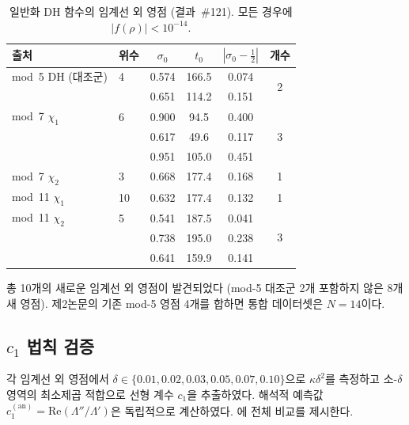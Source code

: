 \documentclass[11pt, a4paper]{article}
\theoremstyle{plain}
\theoremstyle{definition}
\newcommand{\abs}[1]{\left|#1\right|}
\newcommand{\Lam}{\Lambda}             %
\newcommand{\kap}{\kappa}             %
\begin{document}
\begin{table}[ht]
\centering
\caption{일반화 DH 함수의 임계선 외 영점 (결과~\#121).
  모든 경우에 $\abs{f(\rho)} < 10^{-14}$.}
\label{tab:dh-zeros}
\begin{tabular}{@{}llcccc@{}}
\toprule
\textbf{출처} & \textbf{위수} & $\sigma_{0}$ & $t_{0}$ &
  $\abs{\sigma_{0}-\tfrac{1}{2}}$ & \textbf{개수} \\
\midrule
mod~5 DH (대조군) & 4 & 0.574 & 166.5 & 0.074 & \multirow{2}{*}{2} \\
                   &   & 0.651 & 114.2 & 0.151 & \\
\midrule
mod~7 $\chi_{1}$ & 6 & 0.900 & 94.5 & 0.400 & \multirow{3}{*}{3} \\
                 &   & 0.617 & 49.6 & 0.117 & \\
                 &   & 0.951 & 105.0 & 0.451 & \\
\midrule
mod~7 $\chi_{2}$ & 3 & 0.668 & 177.4 & 0.168 & 1 \\
\midrule
mod~11 $\chi_{1}$ & 10 & 0.632 & 177.4 & 0.132 & 1 \\
\midrule
mod~11 $\chi_{2}$ & 5 & 0.541 & 187.5 & 0.041 & \multirow{3}{*}{3} \\
                  &   & 0.738 & 195.0 & 0.238 & \\
                  &   & 0.641 & 159.9 & 0.141 & \\
\bottomrule
\end{tabular}
\end{table}

총 10개의 새로운 임계선 외 영점이 발견되었다 (mod-5 대조군 2개 포함하지 않은 8개 새 영점).
제2논문의 기존 mod-5 영점 4개를 합하면 통합 데이터셋은 $N=14$이다.


\subsection{$c_{1}$ 법칙 검증}
\label{sec:c1-verify}

각 임계선 외 영점에서 $\delta \in \{0.01, 0.02, 0.03, 0.05, 0.07, 0.10\}$으로
$\kap\delta^{2}$를 측정하고 소-$\delta$ 영역의 최소제곱 적합으로 선형 계수 $c_{1}$을
추출하였다. 해석적 예측값 $c_{1}^{(\mathrm{an})} = \mathrm{Re}(\Lam''/\Lam')$은
독립적으로 계산하였다. 에 전체 비교를 제시한다.
\end{document}
